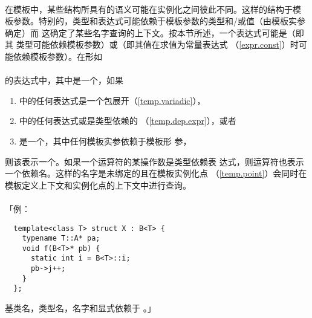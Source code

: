 \paragraph{}
在模板中，某些结构所具有的语义可能在实例化之间彼此不同。这样的结构于模
板参数。特别的，类型和表达式可能依赖于模板参数的类型和/或值（由模板实参确定）而
这确定了某些名字查询的上下文。按本节所述，一个表达式可能是（即其
类型可能依赖模板参数）或（即其值在求值为常量表达式
（\ref{expr.const}）时可能依赖模板参数）。在形如                              \\
\mbox{}                                                                    \\
的表达式中，其中是一个，如果
\begin{enumerate}
  \item{中的任何表达式是一个包展开（\ref{temp.variadic}），}
  \item{中的任何表达式或是类型依赖的
    （\ref{temp.dep.expr}），或者}
  \item{是一个，其中任何模板实参依赖于模板形
    参，}
\end{enumerate}
则该表示一个。如果一个运算符的某操作数是类型依赖表
达式，则运算符也表示一个依赖名。这样的名字是未绑定的且在模板实例化点
（\ref{temp.point}）会同时在模板定义上下文和实例化点的上下文中进行查询。

\paragraph{}
「例：
\begin{lstlisting}
  template<class T> struct X : B<T> {
    typename T::A* pa;
    void f(B<T>* pb) {
      static int i = B<T>::i;
      pb->j++;
    }
  };
\end{lstlisting}
基类名，类型名，名字和显式依赖于
。」

